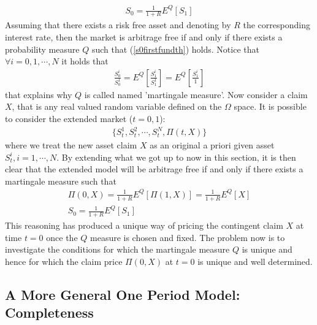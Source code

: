 \documentclass[a4paper,10pt]{report}
\theoremstyle{plain}
\theoremstyle{definition}
\newcommand\be{\begin{eqnarray}}    %
\newcommand\ee{\end{eqnarray}}
\begin{document}
\be 
S_0 =  \frac{1}{1+R} E^Q\left[ S_1\right]
\label{s0firstfundth}
\ee
Assuming that there exists a risk free asset and denoting by $R$ the corresponding interest rate, then the market is arbitrage free if and only if there exists a probability measure $Q$ such that (\ref{s0firstfundth}) holds.
Notice that $\forall i=0,1,\cdots, N$ it holds that 
\be 
\frac{S_0^i}{S_0^1}= E^Q\left[ \frac{S_1^i}{S_1^1} \right] = E^Q\left[ \frac{S_1^i}{1} \right]
\ee
that explains why $Q$ is called named 'martingale measure'.
Now consider a claim $X$, that is any real valued random variable defined on the $\Omega$ space.
It is possible to consider the extended market ($t=0,1$):
\be 
\{ S_t^1, S_t^2, \cdots, S_t^N, \Pi(t, X) \}
\ee
where we treat the new asset claim $X$ as an original a priori given asset $S_t^i, i=1,\cdots, N$. By extending what we got up to now in this section, it is then clear that the extended model will be arbitrage free if and only if there exists a martingale measure such that
\be 
\label{pricing1}
\Pi(0, X)=  \frac{1}{1+R} E^Q\left[ \Pi(1, X)\right] = \frac{1}{1+R} E^Q\left[ X \right] \\ 
S_0 =  \frac{1}{1+R} E^Q\left[ S_1\right]
\ee
This reasoning has produced a unique way of pricing the contingent claim $X$ at time $t=0$ once the $Q$ measure is chosen and fixed. The problem now is to investigate the conditions for which the martingale measure $Q$ is unique and hence for which the claim price $\Pi(0, X)$ at $t=0$ is unique and well determined.

\subsection{A More General One Period Model: Completeness}
\end{document}
